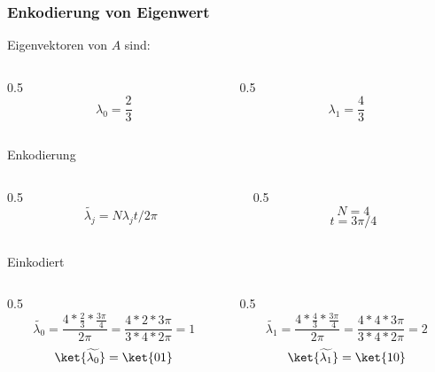 \begin{frame}
    \frametitle{Enkodierung von Eigenwert}

    Eigenvektoren von $A$ sind:    
    \begin{columns}[c]
        \begin{column}{0.5\hsize}\centering
            $$\lambda_0 = \frac{2}{3}$$
        \end{column}

        \begin{column}{0.5\hsize}
            $$\lambda_1 = \frac{4}{3}$$
        \end{column}
    \end{columns}

    \hfil

    Enkodierung
    \begin{columns}[c]
        \begin{column}{0.5\hsize}\centering
        $$\widetilde{\lambda_j} = N\lambda_jt/2\pi$$
        \end{column}

        \begin{column}{0.5\hsize}
            $$N = 4$$
            $$t = 3\pi/4$$
        \end{column}
    \end{columns}


    \hfil

    Einkodiert
    \begin{columns}[c]
        \begin{column}{0.5\hsize}\centering
            $$\widetilde{\lambda_0} =\frac{4*\frac{2}{3}*\frac{3\pi}{4}}{2 \pi} =\frac{4*2*3\pi}{3*4* 2 \pi} = 1$$
            $$\ket{\widetilde{\lambda_0}} = \ket{01}$$
        \end{column}

        \begin{column}{0.5\hsize}
            $$\widetilde{\lambda_1} =\frac{4*\frac{4}{3}*\frac{3\pi}{4}}{2 \pi} =\frac{4*4*3\pi}{3*4* 2 \pi} = 2$$
            $$\ket{\widetilde{\lambda_1}} = \ket{10}$$
        \end{column}
    \end{columns}



    \hfil

\end{frame}


